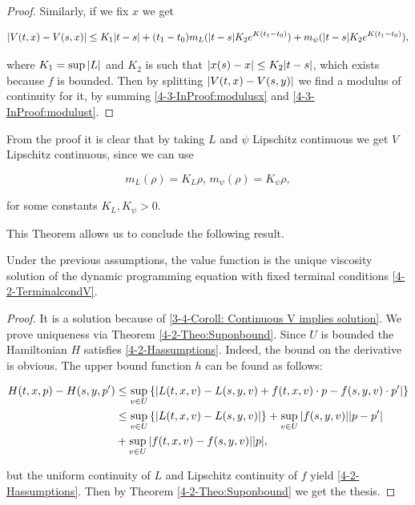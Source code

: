\begin{theorem}
\begin{proof}
        Similarly, if we fix $x$ we get 

        \begin{equation}\label{4-3-InProof:modulusx}
            \abs{V(t,x)-V(s,x)} \leq K_1\abs{t-s} + (t_1-t_0)m_L(\abs{t-s}K_2e^{K(t_1-t_0)}) + m_{\psi}(\abs{t-s}K_2e^{K(t_1-t_0)}),
        \end{equation}

        where $K_1=\sup\abs{L}$ and $K_2$ is such that $\abs{x(s)-x}\leq K_2\abs{t-s}$, which exists because $f$ is bounded. Then by splitting 
        $\abs{V(t,x)-V(s,y)}$ we find a modulus of continuity for it, by summing \ref{4-3-InProof:modulusx} and \ref{4-3-InProof:modulust}. 
    \end{proof}
\end{theorem}

From the proof it is clear that by taking $L$ and $\psi$ Lipschitz continuous we get $V$ Lipschitz continuous, since we can use 

\[m_L(\rho)=K_L\rho,\, m_{\psi}(\rho)=K_{\psi}\rho,\]

for some constants $K_L,K_{\psi}>0$. 

This Theorem allows us to conclude the following result.

\begin{corollary} 
    Under the previous assumptions, the value function is the unique viscosity solution of the dynamic programming equation with fixed terminal conditions \ref{4-2-TerminalcondV}. 

    \begin{proof} 
        It is a solution because of \ref{3-4-Coroll: Continuous V implies solution}. We prove uniqueness via Theorem \ref{4-2-Theo:Suponbound}. 
        Since $U$ is bounded the Hamiltonian $H$ satisfies \ref{4-2-Hassumptions}. Indeed, the bound on the derivative is obvious. 
        The upper bound function $h$ can be found as follows:

        \begin{align*}
            H(t,x,p) - H(s,y,p') & \leq \sup_{v\in U}\left\{\abs{L(t,x,v)-L(s,y,v) + f(t,x,v)\cdot p - f(s,y,v)\cdot p'}\right\} \\
            & \leq \sup_{v\in U}\left\{\abs{L(t,x,v)-L(s,y,v)}\right\} + \sup_{v\in U}\abs{f(s,y,v)}\abs{p-p'} \\
            & + \sup_{v\in U}\abs{f(t,x,v)-f(s,y,v)}\abs{p},
        \end{align*}

        but the uniform continuity of $L$ and Lipschitz continuity of $f$ yield \ref{4-2-Hassumptions}. Then by Theorem \ref{4-2-Theo:Suponbound} we get the thesis.
    \end{proof} 
\end{corollary}


